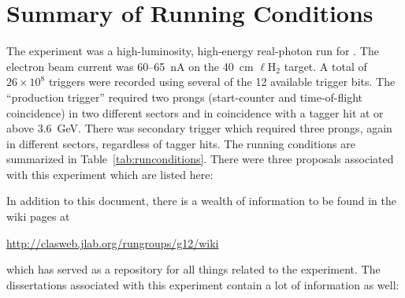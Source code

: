 \section{Summary of Running Conditions}

The  experiment was a high-luminosity, high-energy real-photon run for . The electron beam current was 60--65~nA on the 40~cm $\ell$H$_2$ target. A total of $26\times 10^8$ triggers were recorded using several of the 12 available trigger bits. The ``production trigger'' required two prongs (start-counter and time-of-flight coincidence) in two different sectors and in coincidence with a tagger hit at or above 3.6~GeV. There was secondary trigger which required three prongs, again in different sectors, regardless of tagger hits. The running conditions are summarized in Table~\ref{tab:runconditions}. There were three proposals associated with this experiment which are listed here:

In addition to this document, there is a wealth of information to be found in the wiki pages at
\begin{center}
    \url{http://clasweb.jlab.org/rungroups/g12/wiki}
\end{center}
which has served as a repository for all things related to the  experiment. The dissertations associated with this experiment contain a lot of information as well:







